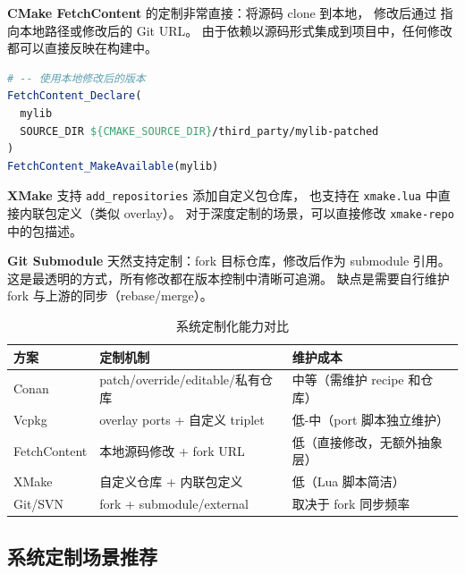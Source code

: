 \documentclass[12pt,a4paper,fontset=fandol]{ctexbook}
\begin{document}
\textbf{CMake FetchContent} 的定制非常直接：将源码 clone 到本地，
修改后通过 \texttt{} 指向本地路径或修改后的 Git URL。
由于依赖以源码形式集成到项目中，任何修改都可以直接反映在构建中。

\begin{lstlisting}[language=CMake, caption={FetchContent 指向本地修改}]
# -- 使用本地修改后的版本
FetchContent_Declare(
  mylib
  SOURCE_DIR ${CMAKE_SOURCE_DIR}/third_party/mylib-patched
)
FetchContent_MakeAvailable(mylib)
\end{lstlisting}

\textbf{XMake} 支持 \texttt{add\_repositories} 添加自定义包仓库，
也支持在 \texttt{xmake.lua} 中直接内联包定义（类似 overlay）。
对于深度定制的场景，可以直接修改 \texttt{xmake-repo} 中的包描述。

\textbf{Git Submodule} 天然支持定制：fork 目标仓库，修改后作为 submodule 引用。
这是最透明的方式，所有修改都在版本控制中清晰可追溯。
缺点是需要自行维护 fork 与上游的同步（rebase/merge）。

\begin{table}[H]
\centering
\caption{系统定制化能力对比}
\label{tab:scenario3}
\small
\begin{tabularx}{\textwidth}{l X X}
\toprule
\textbf{方案} & \textbf{定制机制} & \textbf{维护成本} \\
\midrule
Conan      & patch/override/editable/私有仓库 & 中等（需维护 recipe 和仓库） \\
Vcpkg      & overlay ports + 自定义 triplet   & 低-中（port 脚本独立维护） \\
FetchContent & 本地源码修改 + fork URL        & 低（直接修改，无额外抽象层） \\
XMake      & 自定义仓库 + 内联包定义          & 低（Lua 脚本简洁） \\
Git/SVN    & fork + submodule/external        & 取决于 fork 同步频率 \\
\bottomrule
\end{tabularx}
\end{table}

\subsection{系统定制场景推荐}
\end{document}
